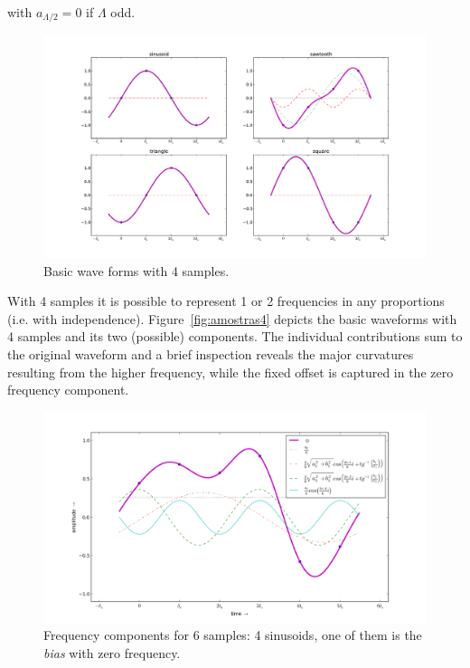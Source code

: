 \documentclass[
 aip,
 jmp,
 amsmath,amssymb,
 reprint,
]{revtex4-1}
\begin{document}
with $a_{\Lambda/2}=0$ if $\Lambda$ odd.

\begin{figure}
    \centering
        \includegraphics[width=\textwidth]{figures/amostras4formas__}
    \caption{Basic wave forms with 4 samples.}
        \label{fig:formas4}
\end{figure}

With 4 samples it is possible to represent 1 or 2 frequencies in any proportions (i.e. with independence). Figure~\ref{fig:amostras4} depicts the basic waveforms with 4 samples and its two (possible) components. The individual contributions sum to the original waveform and a brief inspection reveals the major curvatures resulting from the higher frequency, while the fixed offset is captured in the zero frequency component.

\begin{figure}
    \centering
        \includegraphics[width=\textwidth]{figures/amostras6_}
    \caption{Frequency components for 6 samples: 4 sinusoids, one of them is the \emph{bias} with zero frequency.}
        \label{fig:amostras6}
\end{figure}
\end{document}
